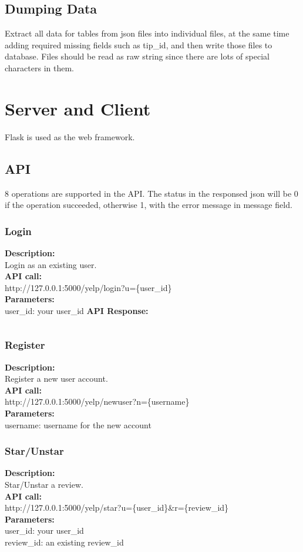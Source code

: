 \documentclass[12pt]{article}
\begin{document}
\subsection{Dumping Data}
Extract all data for tables from json files into individual files, at the same time adding required missing fields such as tip\_id, and then write those files to database. Files should be read as raw string since there are lots of special characters in them.
\section{Server and Client}\label{section-api}
Flask is used as the web framework.
\subsection{API}
8 operations are supported in the API. The status in the responsed json will be 0 if the operation succeeded, otherwise 1, with the error message in message field.

\subsubsection{Login}
\textbf{Description:}\\
Login as an existing user.\\
\textbf{API call:}\\ 
http://127.0.0.1:5000/yelp/login?u=\{user\_id\}\\
\textbf{Parameters:}\\
user\_id: your user\_id
\textbf{API Response:}\\
\begin{lstlisting}
\end{lstlisting}

\subsubsection{Register}
\textbf{Description:}\\
Register a new user account.\\
\textbf{API call:}\\
http://127.0.0.1:5000/yelp/newuser?n=\{username\}\\
\textbf{Parameters:}\\
username: username for the new account

\subsubsection{Star/Unstar}
\textbf{Description:}\\
Star/Unstar a review.\\
\textbf{API call:}\\
http://127.0.0.1:5000/yelp/star?u=\{user\_id\}\&r=\{review\_id\}\\
\textbf{Parameters:}\\
user\_id: your user\_id\\
review\_id: an existing review\_id
\end{document}
